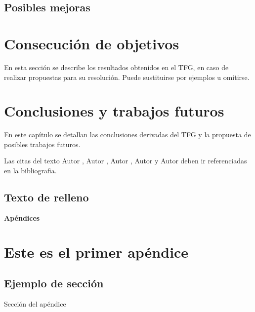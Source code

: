 \documentclass[12pt,twoside,titlepage]{report}
\newcommand\blankpage{%
    \newpage
    \null
    \thispagestyle{empty}%
    \newpage}
\begin{document}
\section{Posibles mejoras}


\chapter{Consecución de objetivos}
\label{sec:resulObtenidos}


En esta sección se describe los resultados obtenidos en el TFG, en caso de realizar propuestas para su resolución. Puede sustituirse por ejemplos u omitirse.

\blankpage



\chapter{Conclusiones y trabajos futuros}

En este capítulo se detallan las conclusiones derivadas del TFG y la propuesta de posibles trabajos futuros.

Las citas del texto Autor \cite{giaquinta}, Autor \cite{fortune}, Autor \cite{fortuneB}, Autor \cite{mitchell} y Autor \cite{morrey} deben ir referenciadas en la bibliografia.


\section{Texto de relleno}

\lipsum[1-18]
\blankpage



{}

\footnotesize{
%


}


\raggedbottom
\afterpage{\blankpage}

\newpage



\appendix

{}

\mbox{}
\vfill
\begin{center}
\begin{Huge}
\textbf{Apéndices}
\end{Huge}
\end{center}
\vfill
\mbox{}
\thispagestyle{empty}

\newpage
\mbox{}
\thispagestyle{empty}
\newpage


\chapter{Este es el primer apéndice}
\label{sec:apendice}


\section{Ejemplo de sección}

Sección del apéndice


\end{document}
